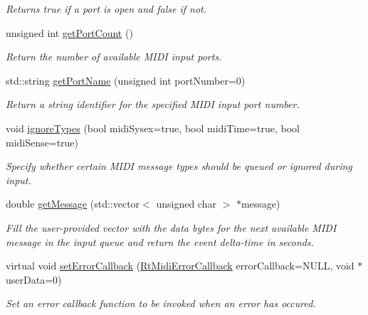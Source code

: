 \begin{DoxyCompactItemize}
\begin{DoxyCompactList}\small\item\em Returns true if a port is open and false if not. \end{DoxyCompactList}\item 
unsigned int \hyperlink{class_rt_midi_in_a62b1b38aa8e5f11cd66f03d59228f4e4}{get\+Port\+Count} ()
\begin{DoxyCompactList}\small\item\em Return the number of available M\+I\+DI input ports. \end{DoxyCompactList}\item 
std\+::string \hyperlink{class_rt_midi_in_af2961fff09fa01a3d5bc0f0c5a042aaf}{get\+Port\+Name} (unsigned int port\+Number=0)
\begin{DoxyCompactList}\small\item\em Return a string identifier for the specified M\+I\+DI input port number. \end{DoxyCompactList}\item 
void \hyperlink{class_rt_midi_in_af9507125aaa42276ccc01df576fc3533}{ignore\+Types} (bool midi\+Sysex=true, bool midi\+Time=true, bool midi\+Sense=true)
\begin{DoxyCompactList}\small\item\em Specify whether certain M\+I\+DI message types should be queued or ignored during input. \end{DoxyCompactList}\item 
double \hyperlink{class_rt_midi_in_a1ba10ecd276b30a8579c7d60a9c890eb}{get\+Message} (std\+::vector$<$ unsigned char $>$ $\ast$message)
\begin{DoxyCompactList}\small\item\em Fill the user-\/provided vector with the data bytes for the next available M\+I\+DI message in the input queue and return the event delta-\/time in seconds. \end{DoxyCompactList}\item 
virtual void \hyperlink{class_rt_midi_in_ad70189a24427b3169d81fcc69f6441e0}{set\+Error\+Callback} (\hyperlink{_rt_midi_8h_a57641d3490f722c3efb9ee1c640e36bb}{Rt\+Midi\+Error\+Callback} error\+Callback=N\+U\+LL, void $\ast$user\+Data=0)
\begin{DoxyCompactList}\small\item\em Set an error callback function to be invoked when an error has occured. \end{DoxyCompactList}\end{DoxyCompactItemize}
